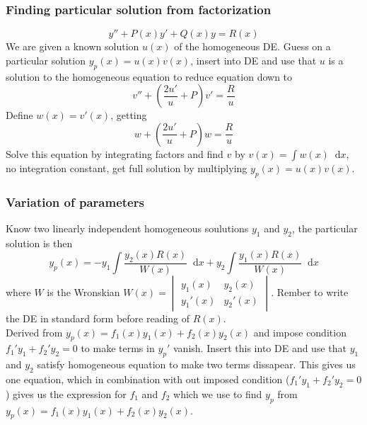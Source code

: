 \documentclass[a4paper, 10pt]{article}
\newcommand*\diff{\mathop{}\!\mathrm{d}}
\begin{document}
\begin{multicols*}{3}
\subsubsection*{\small Finding particular solution from factorization}
$$y'' + P(x)y' + Q(x)y = R(x)$$
We are given a known solution $u(x)$ of the homogeneous DE. Guess on a particular solution $y_p(x) = u(x)v(x)$, insert into DE and use that $u$ is a solution to the homogeneous equation to reduce equation down to
$$ v'' + \left(\frac{2u'}{u}+P\right)v' = \frac{R}{u}$$
Define $w(x)=v'(x)$, getting
$$ w + \left(\frac{2u'}{u}+P\right)w = \frac{R}{u}$$
Solve this equation by integrating factors and find $v$ by $v(x) = \int w(x) \diff x$, no integration constant, get full solution by multiplying $y_p(x) = u(x)v(x)$.

\subsubsection*{\small Variation of parameters}
Know two linearly independent homogeneous soulutions $y_1$ and $y_2$, the particular solution is then
$$ y_p(x) = -y_1 \int \frac{y_2(x)R(x)}{W(x)} \diff x + y_2 \int \frac{y_1(x) R(x)}{W(x)}\diff x$$
where $W$ is the Wronskian $W(x) = \begin{vmatrix} y_1(x)  & y_2(x)\\ y_1'(x) & y_2'(x) \end{vmatrix}.$ Rember to write the DE in standard form before reading of $R(x)$. \\
Derived from $y_p(x) = f_1(x)y_1(x) + f_2(x)y_2(x)$ and impose condition $f_1'y_1 + f_2'y_2 = 0$ to make terms in $y_p'$ vanish. Insert this into DE and use that $y_1$ and $y_2$ satisfy homogeneous equation to make two terms dissapear. This gives us one equation, which in combination with out imposed condition ($f_1'y_1 + f_2'y_2 = 0$) gives us the expression for $f_1$ and $f_2$ which we use to find $y_p$ from $y_p(x) = f_1(x)y_1(x) + f_2(x)y_2(x)$.


\end{multicols*}
\end{document}
